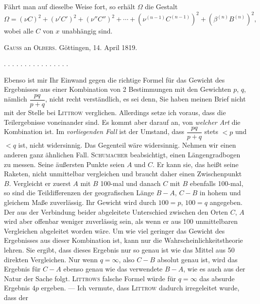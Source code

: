 Fährt man auf dieselbe Weise fort, so erhält $\Omega$ die Gestalt
\[
\Omega = (\nu C)^2+(\nu' C')^2+(\nu'' C'')^2+\cdots+(\nu^{(n-1)} C^{(n-1)})^2+(\beta^{(n)} B^{(n)})^2,
\]
wobei alle $C$ von $x$ unabhängig sind.



\begin{center}
\textsc{Gauss} an \textsc{Olbers}. Göttingen, 14. April 1819.
\end{center}

\begin{center}
. . . . . . . . . . . . . . . .
\end{center}

Ebenso ist mir Ihr Einwand gegen die richtige Formel für das Gewicht des Ergebnisses aus einer Kombination von 2 Bestimmungen mit den Gewichten $p$, $q$, nämlich $\dfrac{pq}{p+q}$, nicht recht verständlich, es sei denn, Sie haben meinen Brief nicht mit der Stelle bei \textsc{Littrow} verglichen. Allerdings setze ich voraus, dass die Teilergebnisse voneinander  sind. Es kommt aber darauf an, von \emph{welcher Art} die Kombination ist. Im \emph{vorliegenden Fall} ist der Umstand, dass $\dfrac{pq}{p+q}$ stets $<p$ und $<q$ ist, nicht widersinnig. Das Gegenteil wäre widersinnig. Nehmen wir einen anderen ganz ähnlichen Fall. \textsc{Schumacher} beabsichtigt, einen Längengradbogen zu messen. Seine äußersten Punkte seien $A$ und $C$. Er kann sie, das heißt seine Raketen, nicht unmittelbar vergleichen und braucht daher einen Zwischenpunkt $B$. Vergleicht er zuerst $A$ mit $B$ 100-mal und danach $C$ mit $B$ ebenfalls 100-mal, so sind die Teildifferenzen der geografischen Länge $B-A$, $C-B$ in hohem und gleichem Maße zuverlässig. Ihr Gewicht wird durch $100=p$, $100=q$ angegeben. Der aus der Verbindung beider abgeleitete Unterschied zwischen den Orten $C$, $A$ wird aber offenbar weniger zuverlässig sein, als wenn er aus 100 unmittelbaren Vergleichen abgeleitet worden wäre. Um wie viel geringer das Gewicht des Ergebnisses aus dieser Kombination ist, kann nur die Wahrscheinlichkeitstheorie lehren. Sie ergibt, dass dieses  Ergebnis nur so genau ist wie das Mittel aus 50 direkten Vergleichen. Nur wenn $q=\infty$, also $C-B$ absolut genau ist, wird das  Ergebnis für $C-A$ ebenso genau wie das verwendete $B-A$, wie es auch aus der Natur der Sache folgt. \textsc{Littrows} falsche Formel würde für $q=\infty$ das absurde Ergebnis $4p$ ergeben. --- Ich vermute, dass \textsc{Littrow} dadurch irregeleitet wurde, dass der
